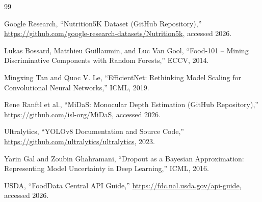 \documentclass[10pt,twocolumn,letterpaper]{article}
\begin{document}
\clearpage
\begin{thebibliography}{99}

Google Research,
``Nutrition5K Dataset (GitHub Repository),''
\url{https://github.com/google-research-datasets/Nutrition5k}, accessed 2026.

Lukas Bossard, Matthieu Guillaumin, and Luc Van Gool,
``Food-101 -- Mining Discriminative Components with Random Forests,''
ECCV, 2014.

Mingxing Tan and Quoc V. Le,
``EfficientNet: Rethinking Model Scaling for Convolutional Neural Networks,''
ICML, 2019.

Rene Ranftl et al.,
``MiDaS: Monocular Depth Estimation (GitHub Repository),''
\url{https://github.com/isl-org/MiDaS}, accessed 2026.

Ultralytics,
``YOLOv8 Documentation and Source Code,''
\url{https://github.com/ultralytics/ultralytics}, 2023.

Yarin Gal and Zoubin Ghahramani,
``Dropout as a Bayesian Approximation: Representing Model Uncertainty in Deep Learning,''
ICML, 2016.

USDA,
``FoodData Central API Guide,''
\url{https://fdc.nal.usda.gov/api-guide}, accessed 2026.

\end{thebibliography}
\end{document}
